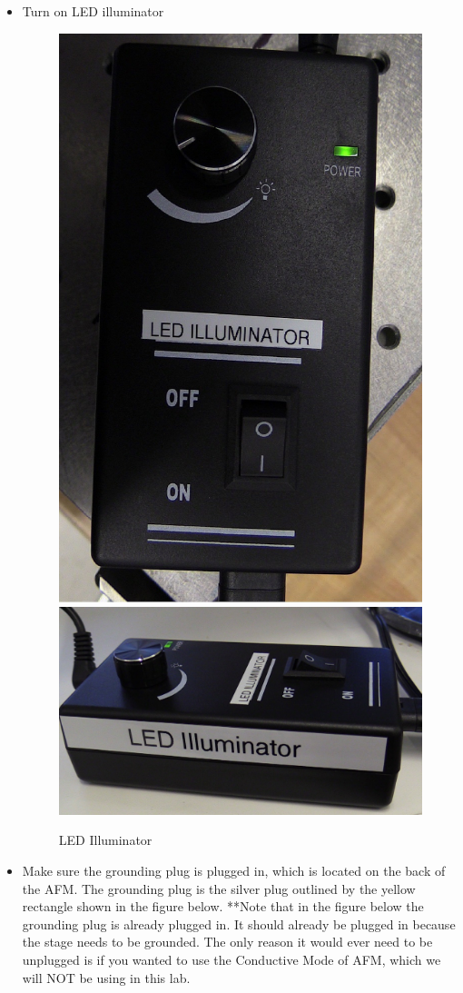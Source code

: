 \documentclass{../lab}
\begin{document}
\begin{itemize}
    \item Turn on LED illuminator
    
     \begin{figure}[H]
        \centering
        \href{http://experimentationlab.berkeley.edu/sites/default/files/AFMImages/LED1.jpg}{\includegraphics[height=0.4\linewidth,keepaspectratio]{images/LED1.jpg}}
        \href{http://experimentationlab.berkeley.edu/sites/default/files/AFMImages/LED2.jpg}{\includegraphics[height=0.4\linewidth,keepaspectratio]{images/LED2.jpg}}
        \caption{LED Illuminator}
    \end{figure}

    \item Make sure the grounding plug is plugged in, which is located on the back of the AFM.  The grounding plug is the silver plug outlined by the yellow rectangle shown in the figure below.  **Note that in the figure below the grounding plug is already plugged in.  It should already be plugged in because the stage needs to be grounded. The only reason it would ever need to be unplugged is if you wanted to use the Conductive Mode of AFM, which we will NOT be using in this lab.
    

\end{itemize}
\end{document}
